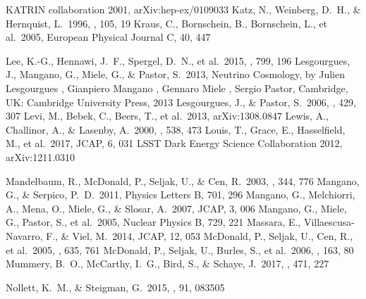\documentclass{emulateapj}
\begin{document}
\begin{thebibliography}{}

 KATRIN collaboration 2001, arXiv:hep-ex/0109033
 Katz, N., Weinberg, D.~H., \& Hernquist, L.\ 1996, \apjs, 105, 19
 Kraus, C., Bornschein, B., Bornschein, L., et al.\ 2005, European Physical Journal C, 40, 447 




 Lee, K.-G., Hennawi, J.~F., Spergel, D.~N., et al.\ 2015, \apj, 799, 196
 Lesgourgues, J., Mangano, G., Miele, G., \& Pastor, S.\ 2013, Neutrino Cosmology, by Julien Lesgourgues , Gianpiero Mangano , Gennaro Miele , Sergio Pastor, Cambridge, UK: Cambridge University Press, 2013 
 Lesgourgues, J., \& Pastor, S.\ 2006, \physrep, 429, 307
 Levi, M., Bebek, C., Beers, T., et al.\ 2013, arXiv:1308.0847
 Lewis, A., Challinor, A., \& Lasenby, A.\ 2000, \apj, 538, 473
 Louis, T., Grace, E., Hasselfield, M., et al.\ 2017, JCAP, 6, 031 
 LSST Dark Energy Science Collaboration 2012, arXiv:1211.0310 

 Mandelbaum, R., McDonald, P., Seljak, U., \& Cen, R.\ 2003, \mnras, 344, 776
 Mangano, G., \& Serpico, P.~D.\ 2011, Physics Letters B, 701, 296 
 Mangano, G., Melchiorri, A., Mena, O., Miele, G., \& Slosar, A.\ 2007, JCAP, 3, 006 
 Mangano, G., Miele, G., Pastor, S., et al.\ 2005, Nuclear Physics B, 729, 221 
 Massara, E., Villaescusa-Navarro, F., \& Viel, M.\ 2014, JCAP, 12, 053 
 McDonald, P., Seljak, U., Cen, R., et al.\ 2005, \apj, 635, 761 
 McDonald, P., Seljak, U., Burles, S., et al.\ 2006, \apjs, 163, 80 
 Mummery, B.~O., McCarthy, I.~G., Bird, S., \& Schaye, J.\ 2017, \mnras, 471, 227 


 Nollett, K.~M., \& Steigman, G.\ 2015, \prd, 91, 083505 




\end{thebibliography}
\end{document}
